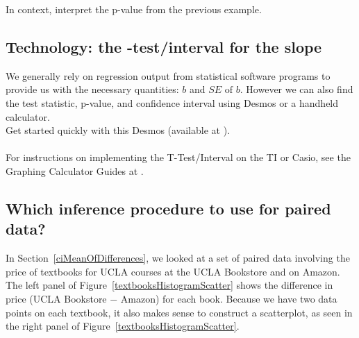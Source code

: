 \begin{exercisewrap}
\begin{exercise}
In context, interpret the p-value from the previous example.\footnotemark
\end{exercise}
\end{exercisewrap}

\D{\newpage}

\subsection[Technology: the $t$-test/interval for the slope]{Technology: the -test/interval for the slope}

\noindent We generally rely on regression output from statistical software programs to provide us with the necessary quantities: $b$ and $SE \text{ of } {b}$.  However we can also find the test statistic, p-value, and confidence interval using Desmos or a handheld calculator.\\

\noindent Get started quickly with this Desmos  ({\small available at }).
\\
\\
For instructions on implementing the T-Test/Interval on the TI or Casio, see the Graphing Calculator Guides at .


\subsection{Which inference procedure to use for paired data?}

In Section~\ref{ciMeanOfDifferences}, we looked at a set of paired data involving the price of textbooks for UCLA courses at the UCLA Bookstore and on Amazon.  The left panel of Figure~\ref{textbooksHistogramScatter} shows the difference in price (UCLA Bookstore $-$ Amazon) for each book.   Because we have two data points on each textbook, it also makes sense to construct a scatterplot, as seen in the right panel of Figure~\ref{textbooksHistogramScatter}.

